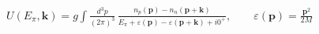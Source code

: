 \documentclass[border=2pt]{standalone}
\begin{document}
$\displaystyle U(E_\pi,\mathbf k)= g\int\!\frac{d^3p}{(2\pi)^3}\,\frac{n_p(\mathbf p)-n_n(\mathbf p+\mathbf k)}{E_\pi+\varepsilon(\mathbf p)-\varepsilon(\mathbf p+\mathbf k)+i0^+},\qquad \varepsilon(\mathbf p)=\frac{\mathbf p^2}{2M}$
\end{document}
